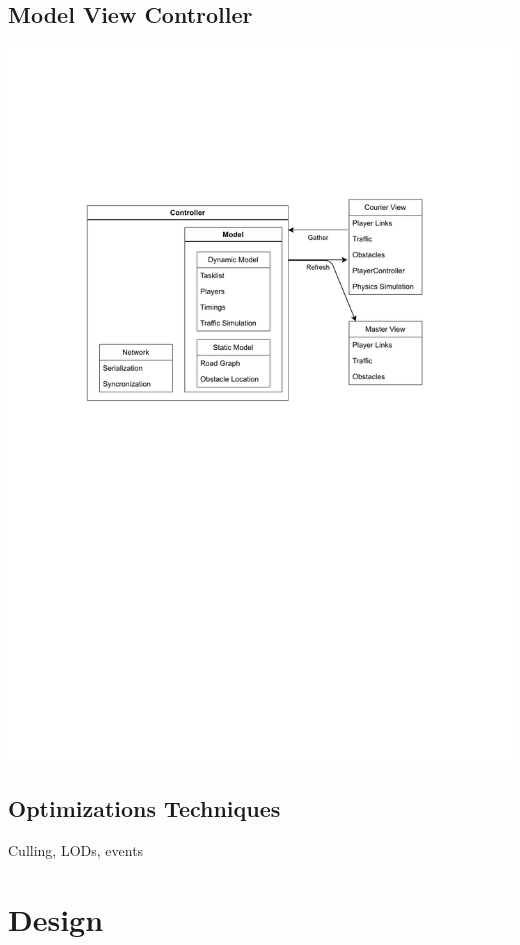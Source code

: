 \documentclass{article}
\begin{document}
\subsection{Model View Controller}
\includegraphics[width=\textwidth]{game architecture}
\subsection{Optimizations Techniques}
Culling, LODs, events

\clearpage

\section{Design}
\end{document}
